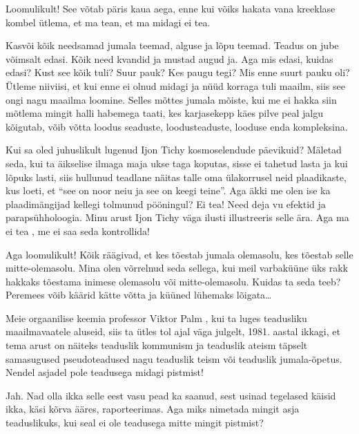 
Loomulikult! See võtab päris kaua aega, enne kui võiks hakata vana kreeklase kombel ütlema, et ma tean, et ma midagi ei tea. 

Kasvõi kõik needsamad jumala teemad, alguse ja lõpu teemad. Teadus on jube võimsalt edasi. Kõik need kvandid ja mustad augud ja. Aga mis edasi, kuidas edasi? Kust see kõik tuli? Suur pauk? Kes paugu tegi? Mis enne suurt pauku oli? Ütleme niiviisi, et kui enne ei olnud midagi ja  nüüd korraga tuli maailm, siis see ongi nagu maailma loomine. Selles mõttes jumala mõiste, kui me ei hakka siin  mõtlema mingit halli habemega taati, kes karjasekepp käes pilve peal jalgu kõigutab, võib võtta loodus seaduste, loodusteaduste, looduse enda kompleksina. 

Kui sa oled juhuslikult lugenud Ijon Tichy kosmoselendude päevikuid? Mäletad seda, kui ta  äikselise ilmaga maja ukse taga koputas, sisse ei tahetud lasta ja kui lõpuks lasti, siis hullunud teadlane näitas talle oma ülakorrusel neid plaadikaste, kus loeti, et \enquote{see on noor neiu ja see on keegi teine}. Aga äkki me olen ise ka plaadimängijad kellegi tolmunud pööningul? Ei tea! Need deja vu efektid ja  parapsühholoogia. Minu arust Ijon Tichy väga ilusti illustreeris selle ära. Aga ma ei tea , me ei saa seda kontrollida! 


Aga loomulikult! Kõik räägivad, et kes tõestab jumala olemasolu, kes tõestab selle mitte-olemasolu. Mina olen võrrelnud seda sellega, kui meil varbaküüne üks rakk hakkaks tõestama inimese olemasolu või mitte-olemasolu. Kuidas ta seda teeb? Peremees võib käärid kätte võtta ja küüned lühemaks lõigata\ldots

Meie orgaanilise keemia professor Viktor Palm , kui ta luges  teadusliku maailmavaatele aluseid, siis ta ütles tol ajal väga julgelt,  1981. aastal ikkagi, et tema arust on näiteks teaduslik kommunism ja teaduslik ateism täpselt samasugused pseudoteadused nagu teaduslik teism või teaduslik jumala-õpetus. Nendel asjadel pole teadusega midagi pistmist!
                 

Jah. Nad olla ikka selle eest vasu pead ka saanud, sest usinad tegelased käisid ikka, käsi kõrva ääres, raporteerimas. Aga miks nimetada mingit asja teaduslikuks, kui seal ei ole teadusega mitte mingit pistmist?
                 
